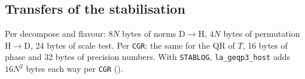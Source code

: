 \subsection{Transfers of the stabilisation}

Per decompose and flavour: $8N$ bytes of norms D$\to$H, $4N$ bytes of permutation H$\to$D, 24 bytes of scale test. Per \texttt{CGR}: the same for the QR of $T$, 16 bytes of phase and 32 bytes of precision numbers. With \texttt{STABLOG}, \texttt{la\_geqp3\_host} adds $16N^2$ bytes each way per \texttt{CGR} ().
